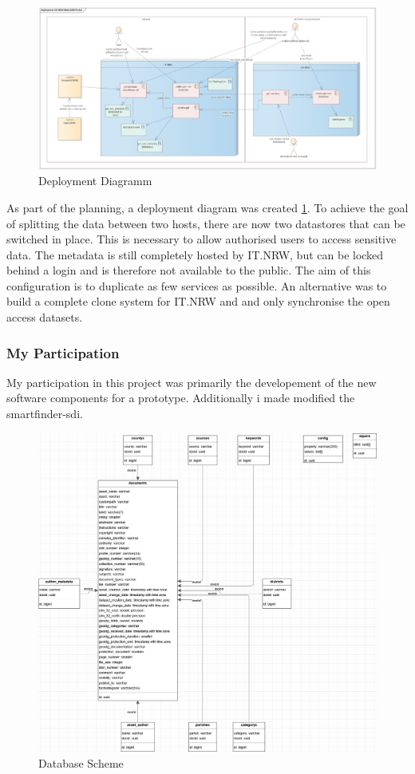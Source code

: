 \documentclass[11pt, titlepage, a4paper]{article}
\begin{document}
\begin{figure}[t]
	\caption{Deployment Diagramm}
	\label{fig:deployment}
	\includegraphics[width=16cm]{deployment.png}
	\centering
\end{figure}

As part of the planning, a deployment diagram was created \ref{fig:deployment}. To achieve the goal of splitting the data between two hosts, there are now two datastores that can be switched in place. This is necessary to allow authorised users to access sensitive data. The metadata is still completely hosted by IT.NRW, but can be locked behind a login and is therefore not available to the public. The aim of this configuration is to duplicate as few services as possible.
An alternative was to build a complete clone system for IT.NRW and  and only synchronise the open access datasets.

\subsubsection{My Participation}
My participation in this project was primarily the developement of the new software components for a prototype. Additionally i made modified the smartfinder-sdi. 

\begin{figure}[t]
	\caption{Database Scheme}
	\label{fig:db}
	\includegraphics[width=16cm]{db3.png}
	\centering
\end{figure}
\end{document}
